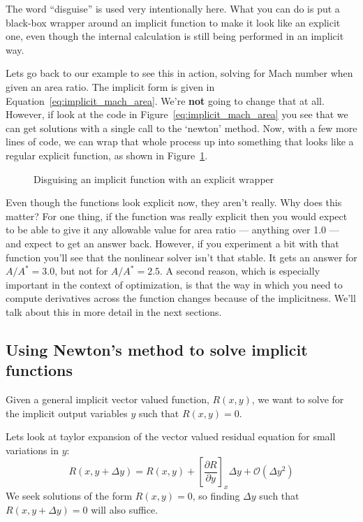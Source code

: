 \documentclass[conf]{new-aiaa}
\begin{document}
The word ``disguise'' is used very intentionally here. What you can do is put a black-box wrapper around an implicit function to make it look like an explicit one, even though the internal calculation is still being performed in an implicit way. 

Lets go back to our example to see this in action, solving for Mach number when given an area ratio. 
The implicit form is given in Equation~\ref{eq:implicit_mach_area}. 
We're \textbf{not} going to change that at all. 
However, if look at the code in Figure~\ref{eq:implicit_mach_area} you see that we can get solutions with a single call to the `newton' method. 
Now, with a few more lines of code, we can wrap that whole process up into something that looks like a regular explicit function, as shown in Figure~\ref{fig:mach-area-fake-explicit}. 
\begin{figure}[H]
    \centering
    
    \caption{Disguising an implicit function with an explicit wrapper}
    \label{fig:mach-area-fake-explicit}
\end{figure}

Even though the functions look explicit now, they aren't really. 
Why does this matter? 
For one thing, if the function was really explicit then you would expect to be able to give it any allowable value for area ratio --- anything over 1.0 --- and expect to get an answer back. 
However, if you experiment a bit with that function you'll see that the nonlinear solver isn't that stable. 
It gets an answer for $A/A^*=3.0$, but not for $A/A^*=2.5$. 
A second reason, which is especially important in the context of optimization, is that the way in which you need to compute derivatives across the function changes because of the implicitness. 
We'll talk about this in more detail in the next sections. 


\subsection*{Using Newton's method to solve implicit functions}

Given a general implicit vector valued function, $R(x,y)$, we want to solve for the implicit output variables $y$ such that $R(x,y)=0$. 

Lets look at taylor expansion of the vector valued residual equation for small variations in $y$: 
\begin{equation}
    R(x,y+\Delta y) = R(x,y) + \left[ \frac{\partial R}{\partial y} \right]_{x} \Delta y + \mathcal{O}( \Delta y^2)
    \label{eq:newton_taylor}
\end{equation}
We seek solutions of the form $R(x,y)=0$, so finding $\Delta y$ such that $R(x,y+\Delta y)=0$ will also suffice. 
\end{document}
